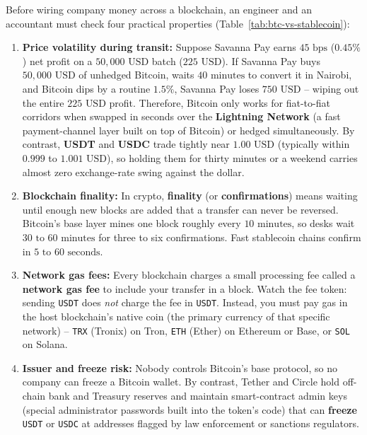 Before wiring company money across a blockchain, an engineer and an accountant must check four practical properties (Table~\ref{tab:btc-vs-stablecoin}):
\begin{enumerate}
  \item \textbf{Price volatility during transit:} Suppose Savanna Pay earns $45\text{ bps}$ ($0.45\%$) net profit on a $50{,}000\text{ USD}$ batch ($225\text{ USD}$). If Savanna Pay buys $50{,}000\text{ USD}$ of unhedged Bitcoin, waits $40\text{ minutes}$ to convert it in Nairobi, and Bitcoin dips by a routine $1.5\%$, Savanna Pay loses $750\text{ USD}$ -- wiping out the entire $225\text{ USD}$ profit. Therefore, Bitcoin only works for fiat-to-fiat corridors when swapped in seconds over the \textbf{Lightning Network} (a fast payment-channel layer built on top of Bitcoin) or hedged simultaneously. By contrast, \textbf{USDT} and \textbf{USDC} trade tightly near $1.00\text{ USD}$ (typically within $0.999$ to $1.001\text{ USD}$), so holding them for thirty minutes or a weekend carries almost zero exchange-rate swing against the dollar.
  \item \textbf{Blockchain finality:} In crypto, \textbf{finality} (or \textbf{confirmations}) means waiting until enough new blocks are added that a transfer can never be reversed. Bitcoin's base layer mines one block roughly every $10\text{ minutes}$, so desks wait $30\text{ to }60\text{ minutes}$ for three to six confirmations. Fast stablecoin chains confirm in $5\text{ to }60\text{ seconds}$.
  \item \textbf{Network gas fees:} Every blockchain charges a small processing fee called a \textbf{network gas fee} to include your transfer in a block. Watch the fee token: sending \texttt{USDT} does \emph{not} charge the fee in \texttt{USDT}. Instead, you must pay gas in the host blockchain's native coin (the primary currency of that specific network) -- \texttt{TRX} (Tronix) on Tron, \texttt{ETH} (Ether) on Ethereum or Base, or \texttt{SOL} on Solana.
  \item \textbf{Issuer and freeze risk:} Nobody controls Bitcoin's base protocol, so no company can freeze a Bitcoin wallet. By contrast, Tether and Circle hold off-chain bank and Treasury reserves and maintain smart-contract admin keys (special administrator passwords built into the token's code) that can \textbf{freeze} \texttt{USDT} or \texttt{USDC} at addresses flagged by law enforcement or sanctions regulators.
\end{enumerate}

